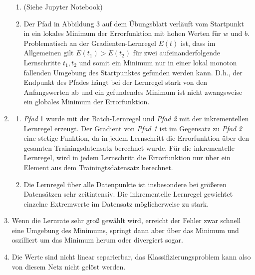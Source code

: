 \documentclass{article}
\begin{document}
\begin{enumerate}
\begin{enumerate}[label=\alph*)]
          \item (Siehe Jupyter Notebook)
          \item Der Pfad in Abbildung 3 auf dem Übungsblatt verläuft vom Startpunkt in ein lokales Minimum der Errorfunktion mit hohen Werten für $w$ und $b$.  Problematisch an der Gradienten-Lernregel $E(t)$ ist, dass im Allgemeinen gilt $E(t_1)>E(t_2)$ für zwei aufeinanderfolgende Lernschritte $t_1, t_2$ und somit ein Minimum nur in einer lokal monoton fallenden Umgebung des Startpunktes gefunden werden kann. D.h., der Endpunkt des Pfades hängt bei der Lernregel stark von den Anfangswerten ab und ein gefundendes Minimum ist nicht zwangsweise ein globales Minimum der Errorfunktion.
        \end{enumerate}
  \item
        \begin{enumerate}[label=\alph*)]
          \item \textit{Pfad} 1 wurde mit der Batch-Lernregel und \textit{Pfad 2} mit der inkrementellen Lernregel erzeugt. Der Gradient von \textit{Pfad 1} ist im Gegensatz zu \textit{Pfad 2} eine stetige Funktion, da in jedem Lernschritt die Errorfunktion über den gesamten Trainingsdatensatz berechnet wurde. Für die inkrementelle Lernregel, wird in jedem Lernschritt die Errorfunktion nur über ein Element aus dem Trainingtsdatensatz berechnet.
          \item Die Lernregel über alle Datenpunkte ist insbesondere bei größeren Datensätzen sehr zeitintensiv. Die inkrementelle Lernregel gewichtet einzelne Extremwerte im Datensatz möglicherweise zu stark.
        \end{enumerate}
  \item Wenn die Lernrate sehr groß gewählt wird, erreicht der Fehler zwar schnell eine Umgebung des Minimums, springt dann aber über das Minimum und oszilliert um das Minimum herum oder divergiert sogar.
  \item Die Werte sind nicht linear separierbar, das Klassifizierungsproblem kann also von diesem Netz nicht gelöst werden.
\end{enumerate}
\end{document}
